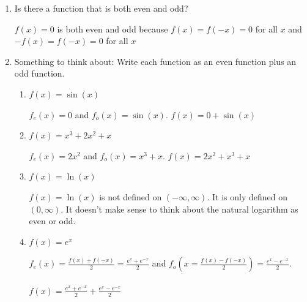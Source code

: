 \documentclass[nooutcomes]{ximera}
\begin{document}
\begin{problem}
\begin{enumerate}
\begin{freeResponse}
		\end{freeResponse}

	\item Is there a function that is both even and odd?
		\begin{freeResponse}
		$f(x)=0$ is both even and odd because $f(x)=f(-x)=0$ for all $x$ and $-f(x)=f(-x)=0$ for all $x$
		\end{freeResponse}

	\item Something to think about:  Write each function as an even function plus an odd function.
	
	\begin{enumerate}
		\item $f(x)=\sin(x)$
			\begin{freeResponse}
				$f_e(x)=0$ and $f_o(x)=\sin(x)$.  $f(x)=0+\sin(x)$

			\end{freeResponse}
				\item $f(x)=x^3+2x^2+x$
			\begin{freeResponse}
				$f_e(x)=2x^2$ and $f_o(x)=x^3+x$.  $f(x)=2x^2+x^3+x$

			\end{freeResponse}
				\item $f(x)=\ln(x)$
			\begin{freeResponse}
				$f(x)=\ln(x)$ is not defined on $(-\infty,\infty)$.  It is only defined on $(0,\infty)$.  It doesn't make sense to think about the natural logarithm as even or odd.
			\end{freeResponse}
				\item $f(x)=e^x$
			\begin{freeResponse}
				$f_e(x)=\frac{f(x)+f(-x)}{2}=\frac{e^x+e^{-x}}{2}$ and $f_o(x=\frac{f(x)-f(-x)}{2})=\frac{e^x-e^{-x}}{2}$.  \\\\
				$f(x)=\frac{e^x+e^{-x}}{2}+\frac{e^x-e^{-x}}{2}$

			\end{freeResponse}	

	\end{enumerate}
	\end{enumerate}
	

\end{problem}
\end{document}
